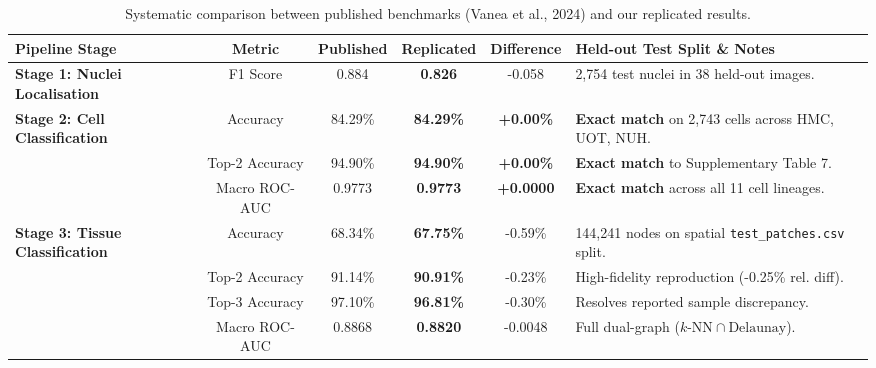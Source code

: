 \documentclass[a4paper,fleqn]{cas-sc}
\begin{document}
\begin{table}[t]
\caption{Systematic comparison between published benchmarks (Vanea et al., 2024) and our replicated results.}
\label{tab:paper_vs_repro}
\centering
\small
\begin{tabularx}{\textwidth}{lccccX}
\toprule
\textbf{Pipeline Stage} & \textbf{Metric} & \textbf{Published} & \textbf{Replicated} & \textbf{Difference} & \textbf{Held-out Test Split \& Notes} \\
\midrule
\rowcolor{LightBlue} \textbf{Stage 1: Nuclei Localisation} & F1 Score & 0.884 & \textbf{0.826} & -0.058 & 2,754 test nuclei in 38 held-out images. \\
\midrule
\textbf{Stage 2: Cell Classification} & Accuracy & 84.29\% & \textbf{84.29\%} & \textbf{+0.00\%} & \textbf{Exact match} on 2,743 cells across HMC, UOT, NUH. \\
& Top-2 Accuracy & 94.90\% & \textbf{94.90\%} & \textbf{+0.00\%} & \textbf{Exact match} to Supplementary Table 7. \\
& Macro ROC-AUC & 0.9773 & \textbf{0.9773} & \textbf{+0.0000} & \textbf{Exact match} across all 11 cell lineages. \\
\midrule
\rowcolor{LightBlue} \textbf{Stage 3: Tissue Classification} & Accuracy & 68.34\% & \textbf{67.75\%} & -0.59\% & 144,241 nodes on spatial \texttt{test\_patches.csv} split. \\
\rowcolor{LightBlue} & Top-2 Accuracy & 91.14\% & \textbf{90.91\%} & -0.23\% & High-fidelity reproduction (-0.25\% rel. diff). \\
\rowcolor{LightBlue} & Top-3 Accuracy & 97.10\% & \textbf{96.81\%} & -0.30\% & Resolves reported sample discrepancy. \\
\rowcolor{LightBlue} & Macro ROC-AUC & 0.8868 & \textbf{0.8820} & -0.0048 & Full dual-graph ($k\text{-NN} \cap \text{Delaunay}$). \\
\bottomrule
\end{tabularx}
\end{table}
\end{document}
